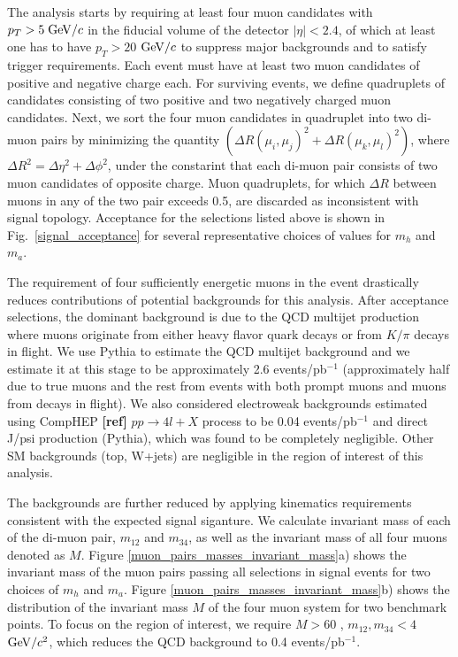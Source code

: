 \documentclass[aps,prl,nofootinbib,superscriptaddress]{revtex4}
\begin{document}
The analysis starts by requiring at least four muon candidates with $p_T>5\;\mbox{${\rm GeV}/c$}$ in the fiducial 
volume of the detector $|\eta|<2.4$, of which at least one has to have $p_T>20$ $\mbox{${\rm GeV}/c$}$ to suppress 
major backgrounds and to satisfy trigger requirements. Each event must have at least two muon 
candidates of positive and negative charge each. For surviving events, we define quadruplets of 
candidates consisting of two positive and two negatively charged muon candidates. Next, we sort the 
four muon candidates in quadruplet into two di-muon pairs by minimizing the quantity 
$(\Delta R(\mu_i,\mu_j)^2 + \Delta R (\mu_k,\mu_l)^2)$, where $\Delta R^2 = \Delta \eta^2 + \Delta \phi^2$, 
under the constarint that each di-muon pair consists of two muon candidates of opposite charge. Muon
quadruplets, for which $\Delta R$ between muons in any of the two pair exceeds 0.5, are discarded as 
inconsistent with signal topology. Acceptance for the selections listed above is shown in 
Fig.~\ref{signal_acceptance} for several representative choices of values for $m_h$ and $m_a$. 

The requirement of four sufficiently energetic muons in the event drastically reduces contributions of 
potential backgrounds for this analysis. After acceptance selections, the dominant background is 
due to the QCD multijet production where muons originate from either heavy flavor quark decays or from 
$K/\pi$ decays in flight. We use Pythia to estimate the QCD multijet background and we estimate it
at this stage to be approximately 2.6 events/pb$^{-1}$ (approximately half due to true muons and the 
rest from events with both prompt muons and muons from decays in flight). We also considered electroweak 
backgrounds estimated using CompHEP {\bf [ref]} $pp \to 4l+X$ process to be 0.04 events/pb$^{-1}$ and direct J/psi 
production (Pythia), which was found to be completely negligible. Other SM backgrounds (top, W+jets) 
are negligible in the region of interest of this analysis.

The backgrounds are further reduced by applying kinematics requirements consistent
with the expected signal siganture. We calculate invariant mass of each of the di-muon pair, 
$m_{12}$ and $m_{34}$, as well as the invariant mass of all four muons denoted as $M$. Figure 
\ref{muon_pairs_masses_invariant_mass}a) shows the invariant mass of the muon pairs passing 
all selections in signal events for two choices of $m_h$ and $m_a$. Figure \ref{muon_pairs_masses_invariant_mass}b) 
shows the distribution of the invariant mass $M$ of the four muon system for two benchmark points. 
To focus on the region of interest, we require $M>60$ \gevcc, $m_{12}, m_{34} < 4$ $\mbox{${\rm GeV}/c^2$}$, which
reduces the QCD background to 0.4 events/pb$^{-1}$. 
\end{document}
